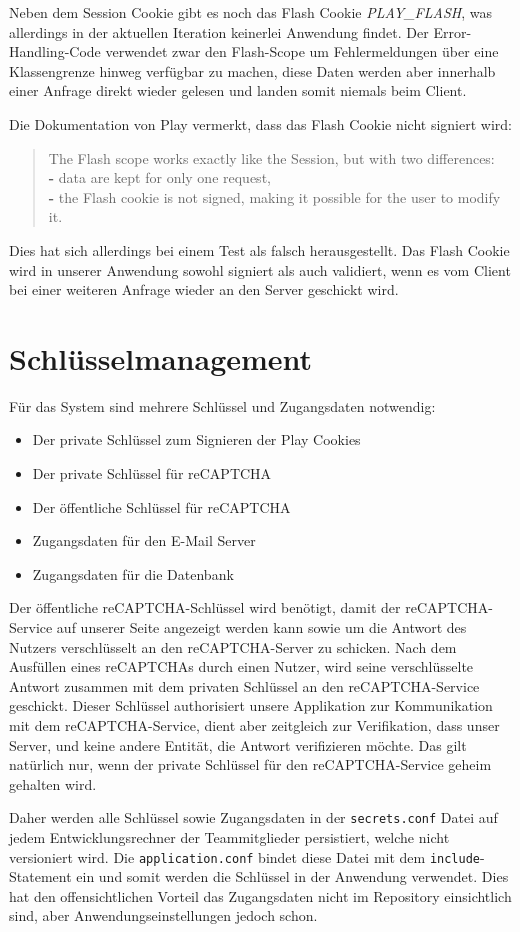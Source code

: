\documentclass[12pt,DIV14,BCOR10mm,a4paper,parskip=half-,headsepline,headinclude,english,ngerman,bibliography=totocnumbered]{scrreprt}
\begin{document}
Neben dem Session Cookie gibt es noch das Flash Cookie \textit{PLAY\_FLASH}, was allerdings in der aktuellen Iteration keinerlei Anwendung findet. Der Error-Handling-Code verwendet zwar den Flash-Scope um Fehlermeldungen über eine Klassengrenze hinweg verfügbar zu machen, diese Daten werden aber innerhalb einer Anfrage direkt wieder gelesen und landen somit niemals beim Client.

Die Dokumentation von Play vermerkt, dass das Flash Cookie nicht signiert wird:
\blockquote{
The Flash scope works exactly like the Session, but with two differences: \\
\textbf{-} data are kept for only one request, \\
\textbf{-} the Flash cookie is not signed, making it possible for the user to modify it. \autocite{JavaPlayFlashDocu}
}
Dies hat sich allerdings bei einem Test als falsch herausgestellt. Das Flash Cookie wird in unserer Anwendung sowohl signiert als auch validiert, wenn es vom Client bei einer weiteren Anfrage wieder an den Server geschickt wird.

\section{Schlüsselmanagement}
Für das System sind mehrere Schlüssel und Zugangsdaten notwendig:

\begin{itemize}
	\item Der private Schlüssel zum Signieren der Play Cookies
	\item Der private Schlüssel für reCAPTCHA
	\item Der öffentliche Schlüssel für reCAPTCHA
	\item Zugangsdaten für den E-Mail Server
	\item Zugangsdaten für die Datenbank
\end{itemize}

Der öffentliche reCAPTCHA-Schlüssel wird benötigt, damit der reCAPTCHA-Service auf unserer Seite angezeigt werden kann sowie um die Antwort des Nutzers verschlüsselt an den reCAPTCHA-Server zu schicken.
Nach dem Ausfüllen eines reCAPTCHAs durch einen Nutzer, wird seine verschlüsselte Antwort zusammen mit dem privaten Schlüssel an den reCAPTCHA-Service geschickt.
Dieser Schlüssel authorisiert unsere Applikation zur Kommunikation mit dem reCAPTCHA-Service, dient aber zeitgleich zur Verifikation, dass unser Server, und keine andere Entität, die Antwort verifizieren möchte.
Das gilt natürlich nur, wenn der private Schlüssel für den reCAPTCHA-Service geheim gehalten wird.
\par
Daher werden alle Schlüssel sowie Zugangsdaten in der \texttt{secrets.conf} Datei auf jedem Entwicklungsrechner der Teammitglieder persistiert, welche nicht versioniert wird. Die \texttt{application.conf} bindet diese Datei mit dem \texttt{include}-Statement ein und somit werden die Schlüssel in der Anwendung verwendet. Dies hat den offensichtlichen Vorteil das Zugangsdaten nicht im Repository einsichtlich sind, aber Anwendungseinstellungen jedoch schon.
\end{document}
